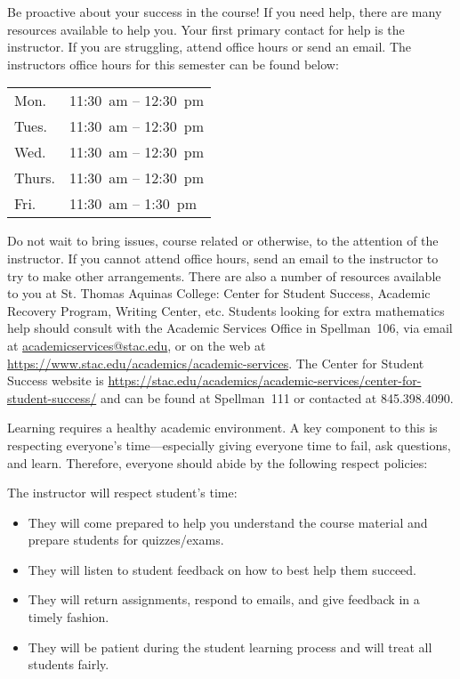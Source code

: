 \documentclass[11pt,letterpaper]{article}
\begin{document}
Be proactive about your success in the course! If you need help, there are many resources available to help you. Your first primary contact for help is the instructor. If you are struggling, attend office hours or send an email. The instructors office hours for this semester can be found below: \par
	\begin{table}[!ht]
	\centering
	\begin{tabular}{l || l}
	Mon. & 11:30~am -- 12:30~pm \\
	Tues. & 11:30~am -- 12:30~pm \\
	Wed. & 11:30~am -- 12:30~pm \\
	Thurs. & 11:30~am -- 12:30~pm \\
	Fri. & 11:30~am -- 1:30~pm
	\end{tabular}
	\end{table}
Do not wait to bring issues, course related or otherwise, to the attention of the instructor. If you cannot attend office hours, send an email to the instructor to try to make other arrangements. There are also a number of resources available to you at St. Thomas Aquinas College: Center for Student Success, Academic Recovery Program, Writing Center, etc. Students looking for extra mathematics help should consult with the Academic Services Office in Spellman~106, via email at \href{mailto:AcademicServices@stac.edu}{academicservices@stac.edu}, or on the web at \href{https://www.stac.edu/academics/academic-services}{https://www.stac.edu/academics/academic-services}. The Center for Student Success website is \url{https://stac.edu/academics/academic-services/center-for-student-success/} and can be found at Spellman~111 or contacted at 845.398.4090. \sectionbreak



Learning requires a healthy academic environment. A key component to this is respecting everyone's time---especially giving everyone time to fail, ask questions, and learn. Therefore, everyone should abide by the following respect policies: \pspace

The instructor will respect student's time:
	\begin{itemize}
	\item They will come prepared to help you understand the course material and prepare students for quizzes/exams. 
	\item They will listen to student feedback on how to best help them succeed. 
	\item They will return assignments, respond to emails, and give feedback in a timely fashion. 
	\item They will be patient during the student learning process and will treat all students fairly. 
	\end{itemize} \pspace
\end{document}
